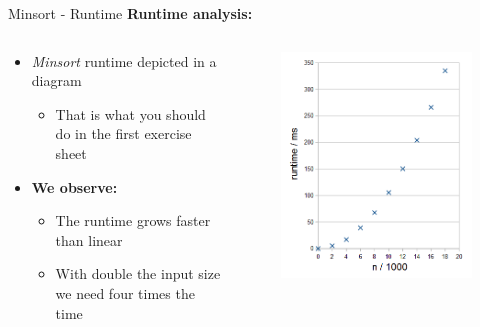 
\begin{frame}{Minsort - Runtime}
  \textbf{Runtime analysis:}
  \vspace{-0.5em}
  \begin{columns}%
    \begin{column}[t]{0.5\textwidth}%
      \begin{itemize}
        \item
          \textit{Minsort} runtime depicted in a diagram
          \begin{itemize}
            \item
              That is what you should do in the first exercise sheet
          \end{itemize}
        \item<2- |handout:1>
          \textbf{We observe:}\\
          \begin{itemize}
            \item
              The runtime {\color{Mittel-Blau}grows faster than linear}
            \item
              With double the input size we need four times the time
          \end{itemize}
      \end{itemize}
    \end{column}%
    \begin{column}[t]{0.45\textwidth}%
      \begin{center}%
        \begin{figure}[!h]%
          \includegraphics[width=\textwidth]{Images/MinSort/Minsort.png}%

\end{figure}
\end{center}
\end{column}
\end{columns}
\end{frame}
